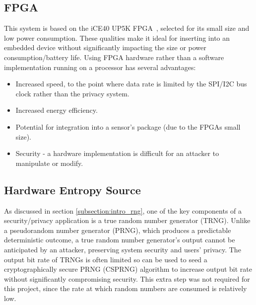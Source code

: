 \documentclass[12pt]{article}
\begin{document}
    \subsection{FPGA}
      This system is based on the iCE40 UP5K FPGA~\cite{iCE40}, selected for its small size and low power consumption. These qualities make it ideal for inserting into an embedded device without significantly impacting the size or power consumption/battery life. Using FPGA hardware rather than a software implementation running on a processor has several advantages:

      \begin{itemize}
        \item Increased speed, to the point where data rate is limited by the SPI/I2C bus clock rather than the privacy system.
        \item Increased energy efficiency.
        \item Potential for integration into a sensor's package (due to the FPGAs small size).
        \item Security - a hardware implementation is difficult for an attacker to manipulate or modify.
      \end{itemize}

    \subsection{Hardware Entropy Source} \label{subsection:hardware_entropy_source}
      As discussed in section \ref{subsection:intro_rng}, one of the key components of a security/privacy application is a true random number generator (TRNG). Unlike a pseudorandom number generator (PRNG), which produces a predictable deterministic outcome, a true random number generator's output cannot be anticipated by an attacker, preserving system security and users' privacy. The output bit rate of TRNGs is often limited so can be used to seed a cryptographically secure PRNG (CSPRNG) algorithm to increase output bit rate without significantly compromising security. This extra step was not required for this project, since the rate at which random numbers are consumed is relatively low.\\
\end{document}
